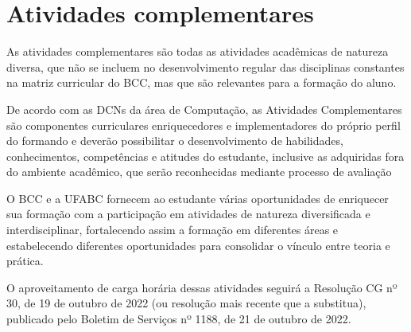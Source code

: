 \section{Atividades complementares}
\label{sec:atividades_complementares}

As atividades complementares são todas as atividades acadêmicas de natureza diversa, que
não se incluem no desenvolvimento regular das disciplinas constantes na matriz
curricular do BCC, mas que são relevantes para a formação do aluno.

De acordo com as DCNs da área de Computação, as Atividades Complementares são componentes curriculares enriquecedores e implementadores do próprio perfil do formando e deverão possibilitar o desenvolvimento de habilidades, conhecimentos, competências e atitudes do estudante, inclusive as adquiridas fora do ambiente acadêmico, que serão reconhecidas mediante processo de avaliação 

O BCC e a UFABC fornecem ao estudante várias oportunidades de enriquecer sua formação com a
participação em atividades de natureza diversificada e interdisciplinar, fortalecendo assim a formação em diferentes áreas e estabelecendo diferentes oportunidades para consolidar o vínculo entre teoria e prática.

O aproveitamento de carga horária dessas atividades seguirá a Resolução CG nº 30, de 19 de outubro de 2022 (ou resolução mais recente que a substitua), publicado pelo Boletim de Serviços nº 1188, de 21 de outubro de 2022.
